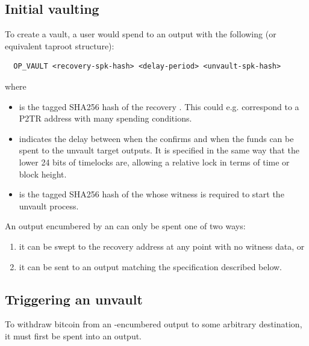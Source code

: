 \documentclass[10pt]{article}
\begin{document}
\subsection*{Initial vaulting}

To create a vault, a user would spend to an output with the following
\spk{} (or equivalent taproot structure):

\begin{verbatim}
  OP_VAULT <recovery-spk-hash> <delay-period> <unvault-spk-hash> 
\end{verbatim}
\noindent where

\begin{itemize}
  \item {} is the tagged SHA256 hash of the recovery \spk{}. 
    This could e.g. correspond to a P2TR address with many spending conditions.

  \item {} indicates the delay between when the \opuv{} confirms
    and when the funds can be spent to the unvault target outputs. It is specified
    in the same way that the lower 24 bits of  timelocks are, allowing
    a relative lock in terms of time or block height.

  \item {} is the tagged SHA256 hash of the \spk{} whose 
    witness is required to start the unvault process.

\end{itemize}

An output encumbered by an \opv{} \spk{} can only be spent one of two ways: 

\begin{enumerate}
  \item it can be swept to the recovery address at any point with no witness data, or
  \item it can be sent to an \opuv{} output matching the specification described
    below.
\end{enumerate}



\subsection*{Triggering an unvault}

To withdraw bitcoin from an \opv{}-encumbered output to some arbitrary destination, it
must first be spent into an \opuv{} output.
\end{document}
